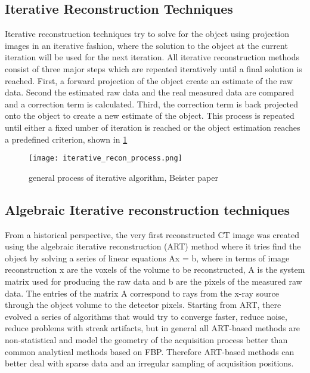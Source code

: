 \subsection{Iterative Reconstruction Techniques}
Iterative reconstruction techniques try to solve for the object using projection images in an iterative fashion, where the solution to the object at the current iteration will be used for the next iteration.  All iterative reconstruction methods consist of three major steps which are repeated iteratively until a final solution is reached.  First, a forward projection of the object create an estimate of the raw data.  Second the estimated raw data and the real measured data are compared and a correction term is calculated.  Third, the correction term is back projected onto the object to create a new estimate of the object.  This process is repeated until either a fixed umber of iteration is reached or the object estimation reaches a predefined criterion, shown in \ref{fig:generalIR}

\begin{figure}
\centering
\texttt{[image: iterative\_recon\_process.png]}
\caption{general process of iterative algorithm, Beister paper}
\label{fig:generalIR}
\end{figure}

\subsection{Algebraic Iterative reconstruction techniques}
From a historical perspective, the very first reconstructed CT image was created using the algebraic iterative reconstruction (ART) method where it tries find the object by solving a series of linear equations Ax = b, where in terms of image reconstruction x are the voxels of the volume to be reconstructed, A is the system matrix used for producing the raw data and b are the pixels of the measured raw data.  The entries of the matrix A correspond to rays from the x-ray source through the object volume to the detector pixels.  Starting from ART, there evolved a series of algorithms that would try to converge faster, reduce noise, reduce problems with streak artifacts, but in general all ART-based methods are non-statistical and model the geometry of the acquisition process better than common analytical methods based on FBP.  Therefore ART-based methods can better deal with sparse data and an irregular sampling of acquisition positions\citep{Beister2012}.

